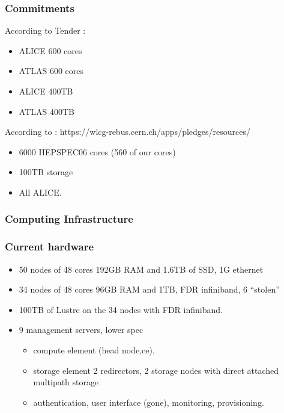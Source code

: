 \documentclass{beamer}
\begin{document}
\begin{frame}
\frametitle{Commitments}
According to Tender :
\begin{itemize}
  \item ALICE 600 cores
  \item ATLAS 600 cores
  \item ALICE 400TB
  \item ATLAS 400TB
\end{itemize}
According to :
https://wlcg-rebus.cern.ch/apps/pledges/resources/
\begin{itemize}
  \item 6000 HEPSPEC06 cores (560 of our cores)
  \item 100TB storage
  \item All ALICE.
\end{itemize}
\end{frame}

\begin{frame}
  \frametitle{Computing Infrastructure}
\end{frame}

\begin{frame}
  \frametitle{Current hardware}
  \begin{itemize}
    \item 50 nodes of 48 cores 192GB RAM and 1.6TB of SSD, 1G ethernet
    \item 34 nodes of 48 cores 96GB RAM and 1TB, FDR infiniband, 6 ``stolen''
    \item 100TB of Lustre on the 34 nodes with FDR infiniband.
    \item 9 management servers, lower spec 
  \begin{itemize}
    \item compute element (head node,ce),
    \item storage element 2 redirectors, 2 storage nodes with direct attached multipath storage
    \item authentication, user interface (gone), monitoring, provisioning. 
  \end{itemize}
  \end{itemize}
\end{frame}
\end{document}
